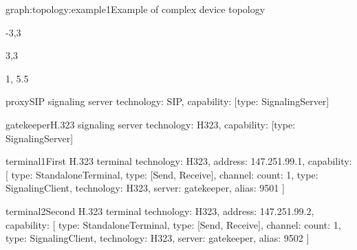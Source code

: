 \begin{Graph}{graph:topology:example1}{Example of complex device topology}  
  \begin{SubGraph}{-3,3}{}
  \end{SubGraph}
  
  \begin{SubGraph}{3,3}{}
  \end{SubGraph}
  
  
  \begin{GraphLegend}{1, 5.5}
  \end{GraphLegend}
\end{Graph}

\begin{TopologyExample}{proxy}{SIP signaling server}
technology: SIP, capability: [{type: SignalingServer}]
\end{TopologyExample}

\begin{TopologyExample}{gatekeeper}{H.323 signaling server}
technology: H323, capability: [{type: SignalingServer}]
\end{TopologyExample}

\begin{TopologyExample}{terminal1}{First H.323 terminal}
technology: H323, address: 147.251.99.1,
capability: [
  {type: StandaloneTerminal}, {type: [Send, Receive], channel: {count: 1}}, 
  {type: SignalingClient, technology: H323, server: gatekeeper, alias: 9501}
]
\end{TopologyExample}

\begin{TopologyExample}{terminal2}{Second H.323 terminal}
technology: H323, address: 147.251.99.2,
capability: [
  {type: StandaloneTerminal}, {type: [Send, Receive], channel: {count: 1}}, 
  {type: SignalingClient, technology: H323, server: gatekeeper, alias: 9502}
]
\end{TopologyExample}

